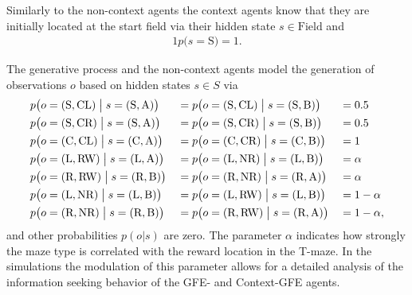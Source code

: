 Similarly to the non-context agents the context agents know that they are initially located at the start field via their hidden state \(s \in \text{Field}\) and
\begin{alignat}{1}
    p\bigl(s=\text{S}\bigr)=1.
\end{alignat}

The generative process and the non-context agents model the generation of observations \(o\) based on hidden states \(s \in S\) via
\begin{alignat}{3}
    & p\bigl(o=(\text{S},\text{CL})\bigm|s=(\text{S},\text{A})\bigr) &  & = p\bigl(o=(\text{S},\text{CL})\bigm|s=(\text{S},\text{B})\bigr) &  & = 0.5      \nonumber \\
    & p\bigl(o=(\text{S},\text{CR})\bigm|s=(\text{S},\text{A})\bigr) &  & = p\bigl(o=(\text{S},\text{CR})\bigm|s=(\text{S},\text{B})\bigr) &  & = 0.5      \nonumber \\
    & p\bigl(o=(\text{C},\text{CL})\bigm|s=(\text{C},\text{A})\bigr) &  & = p\bigl(o=(\text{C},\text{CR})\bigm|s=(\text{C},\text{B})\bigr) &  & = 1        \nonumber \\
    & p\bigl(o=(\text{L},\text{RW})\bigm|s=(\text{L},\text{A})\bigr) &  & = p\bigl(o=(\text{L},\text{NR})\bigm|s=(\text{L},\text{B})\bigr) &  & = \alpha   \nonumber \\
    & p\bigl(o=(\text{R},\text{RW})\bigm|s=(\text{R},\text{B})\bigr) &  & = p\bigl(o=(\text{R},\text{NR})\bigm|s=(\text{R},\text{A})\bigr) &  & = \alpha   \nonumber \\
    & p\bigl(o=(\text{L},\text{NR})\bigm|s=(\text{L},\text{B})\bigr) &  & = p\bigl(o=(\text{L},\text{RW})\bigm|s=(\text{L},\text{B})\bigr) &  & = 1-\alpha \nonumber \\
    & p\bigl(o=(\text{R},\text{NR})\bigm|s=(\text{R},\text{B})\bigr) &  & = p\bigl(o=(\text{R},\text{RW})\bigm|s=(\text{R},\text{A})\bigr) &  & = 1-\alpha,
\end{alignat}
and other probabilities \(p(o|s)\) are zero. The parameter \(\alpha\) indicates how strongly the maze type is correlated with the reward location in the T-maze. In the simulations the modulation of this parameter allows for a detailed analysis of the information seeking behavior of the GFE- and Context-GFE agents.

